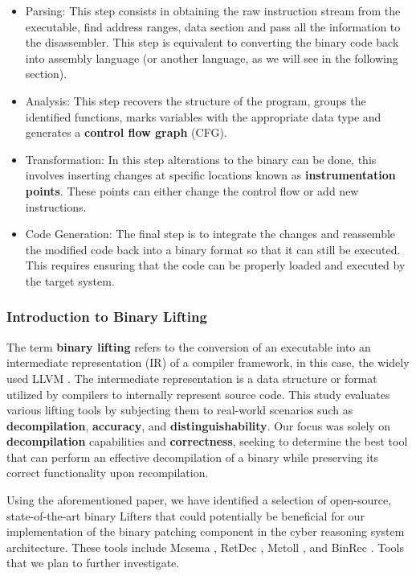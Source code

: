 \documentclass[12pt,a4paper,english,onecolumn]{IEEEtran}
\begin{document}
\begin{itemize}
    \item Parsing: This step consists in obtaining the raw instruction stream from the executable, find address ranges, data section and pass all the information to the disassembler. This step is equivalent to converting the binary code back into assembly language (or another language, as we will see in the following section).
    \item Analysis: This step recovers the structure of the program, groups the identified functions, marks variables with the appropriate data type and generates a \textbf{control flow graph} (CFG).
    \item Transformation: In this step alterations to the binary can be done, this involves inserting changes at specific locations known as \textbf{instrumentation points}. These points can either change the control flow or add new instructions.
    \item Code Generation: The final step is to integrate the changes and reassemble the modified code back into a binary format so that it can still be executed. This requires ensuring that the code can be properly loaded and executed by the target system.
\end{itemize}

\subsubsection{Introduction to Binary Lifting}

The term \textbf{binary lifting} \cite{sok} refers to the conversion of an executable into an intermediate representation (IR) of a compiler framework, in this case, the widely used LLVM \cite{llvm}. The intermediate representation is a data structure or format utilized by compilers to internally represent source code. This study \cite{sok} evaluates various lifting tools by subjecting them to real-world scenarios such as \textbf{decompilation}, \textbf{accuracy}, and \textbf{distinguishability}. Our focus was solely on \textbf{decompilation} capabilities and \textbf{correctness}, seeking to determine the best tool that can perform an effective decompilation of a binary while preserving its correct functionality upon recompilation.

Using the aforementioned paper, we have identified a selection of open-source, state-of-the-art binary Lifters that could potentially be beneficial for our implementation of the binary patching component in the cyber reasoning system architecture. These tools include Mcsema \cite{mcsema}, RetDec \cite{retdec}, Mctoll \cite{llvm_mctoll}, and BinRec \cite{binrec}. Tools that we plan to further investigate.
\end{document}
